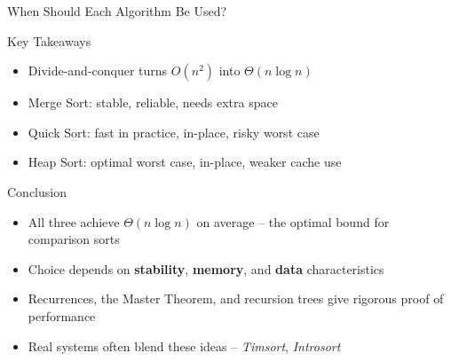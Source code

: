 \documentclass[9pt,aspectratio=169]{beamer}
\begin{document}
\begin{frame}{When Should Each Algorithm Be Used?}
\begin{center}
\end{center}
\end{frame}

\begin{frame}{Key Takeaways}
\begin{itemize}
  \setlength\itemsep{5mm}
  \item Divide-and-conquer turns \(O(n^2)\) into \(\Theta(n\log n)\)
  \item Merge Sort: stable, reliable, needs extra space
  \item Quick Sort: fast in practice, in-place, risky worst case
  \item Heap Sort: optimal worst case, in-place, weaker cache use
\end{itemize}
\end{frame}

\begin{frame}{Conclusion}
\begin{itemize}
  \item All three achieve \(\Theta(n\log n)\) on average -- the optimal bound for comparison sorts
  \item Choice depends on \textbf{stability}, \textbf{memory}, and \textbf{data} characteristics
  \item Recurrences, the Master Theorem, and recursion trees give rigorous proof of performance
  \item Real systems often blend these ideas -- \emph{Timsort}, \emph{Introsort}
\end{itemize}
\end{frame}
\end{document}
